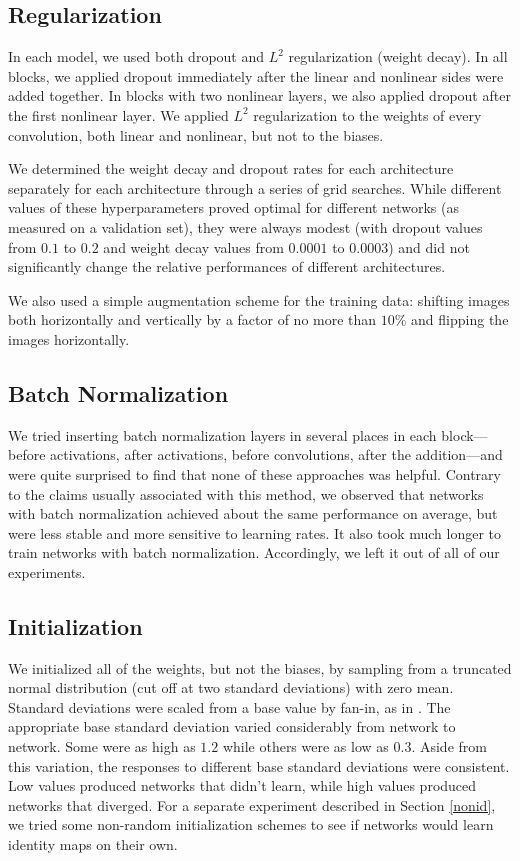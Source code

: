 \documentclass{article} %
\begin{document}
\subsection{Regularization}

In each model, we used both dropout and $L^2$ regularization (weight decay). In all blocks, we applied dropout immediately after the linear and nonlinear sides were added together. In blocks with two nonlinear layers, we also applied dropout after the first nonlinear layer. We applied $L^2$ regularization to the weights of every convolution, both linear and nonlinear, but not to the biases.

We determined the weight decay and dropout rates for each architecture separately for each architecture through a series of grid searches. While different values of these hyperparameters proved optimal for different networks (as measured on a validation set), they were always modest (with dropout values from $0.1$ to $0.2$ and weight decay values from $0.0001$ to $0.0003$) and did not significantly change the relative performances of different architectures. 

We also used a simple augmentation scheme for the training data: shifting images both horizontally and vertically by a factor of no more than $10\%$ and flipping the images horizontally.

\subsection{Batch Normalization}

We tried inserting batch normalization layers in several places in each block---before activations, after activations, before convolutions, after the addition---and were quite surprised to find that none of these approaches was helpful. Contrary to the claims usually associated with this method, we observed that networks with batch normalization achieved about the same performance on average, but were less stable and more sensitive to learning rates. It also took much longer to train networks with batch normalization. Accordingly, we left it out of all of our experiments.

\subsection{Initialization}

We initialized all of the weights, but not the biases, by sampling from a truncated normal distribution (cut off at two standard deviations) with zero mean. Standard deviations were scaled from a base value by fan-in, as in \cite{ResNets}. The appropriate base standard deviation varied considerably from network to network. Some were as high as $1.2$ while others were as low as $0.3$. Aside from this variation, the responses to different base standard deviations were consistent. Low values produced networks that didn't learn, while high values produced networks that diverged. For a separate experiment described in Section \ref{nonid}, we tried some non-random initialization schemes to see if networks would learn identity maps on their own.
\end{document}
